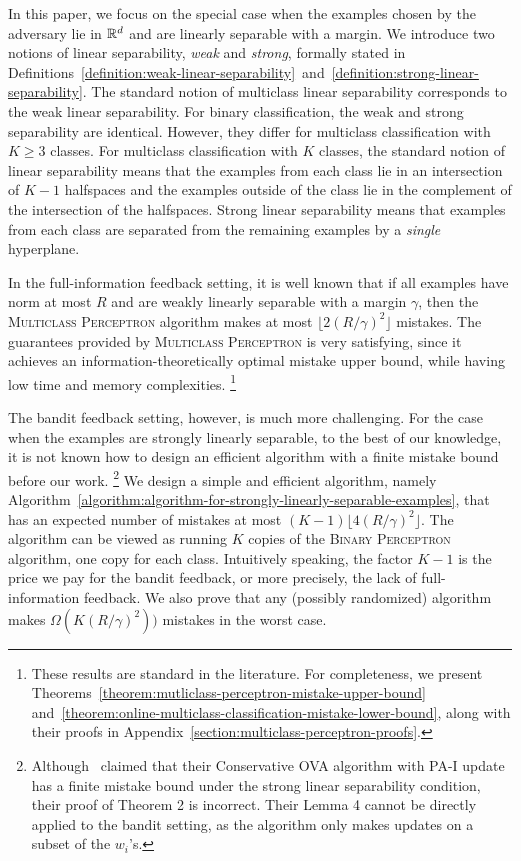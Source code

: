 In this paper, we focus on the special case when the examples chosen by the
adversary lie in $\mathbb{R}^d$ and are linearly separable with a margin. We introduce
two notions of linear separability, \emph{weak} and \emph{strong},
formally stated in
Definitions~\ref{definition:weak-linear-separability}~and~\ref{definition:strong-linear-separability}.
The standard notion of multiclass linear separability corresponds to the weak
linear separability. For binary classification, the weak and strong separability
are identical. However, they differ for multiclass classification with $K \ge 3$
classes. For multiclass classification with $K$ classes, the standard notion of
linear separability means that the examples from each class lie in an
intersection of $K-1$ halfspaces and the examples outside of the class lie in
the complement of the intersection of the halfspaces. Strong linear separability
means that examples from each class are separated from the remaining examples by
a \emph{single} hyperplane.

In the full-information feedback setting, it is well known that if all examples
have norm at most $R$ and are weakly linearly separable with a margin $\gamma$,
then the \textsc{Multiclass Perceptron} algorithm makes at most $\lfloor
2(R/\gamma)^2 \rfloor$ mistakes.
The guarantees provided by \textsc{Multiclass Perceptron} is very satisfying,
since it achieves an information-theoretically optimal mistake upper bound,
while having low time and memory complexities.
\footnote{These results are standard in the literature. For completeness, we present Theorems~\ref{theorem:mutliclass-perceptron-mistake-upper-bound}
and~\ref{theorem:online-multiclass-classification-mistake-lower-bound},
along with their proofs in Appendix~\ref{section:multiclass-perceptron-proofs}.}

The bandit feedback setting, however, is much more challenging. For the case
when the examples are strongly linearly separable, to the best
of our knowledge, it is not known how to design
an efficient algorithm with a finite mistake bound before our work.
\footnote{Although~\cite{Chen-Chen-Zhang-Chen-Zhang-2009} claimed that their
Conservative OVA algorithm with PA-I update has a finite mistake bound under the
strong linear separability condition, their proof of Theorem 2 is incorrect.
Their Lemma 4 cannot be directly applied to the bandit setting, as the algorithm
only makes updates on a subset of the $w_i$'s.}
We design a simple and
efficient algorithm, namely
Algorithm~\ref{algorithm:algorithm-for-strongly-linearly-separable-examples},
that has an expected number of mistakes at most $(K-1) \lfloor
4(R/\gamma)^2 \rfloor$. The algorithm can be viewed as running $K$ copies of the
\textsc{Binary Perceptron} algorithm, one copy for each class. Intuitively
speaking, the factor $K-1$ is the price we pay for the bandit feedback, or more
precisely, the lack of full-information feedback. We also prove that any
(possibly randomized) algorithm makes $\Omega(K (R/\gamma)^2))$ mistakes in the
worst case.

